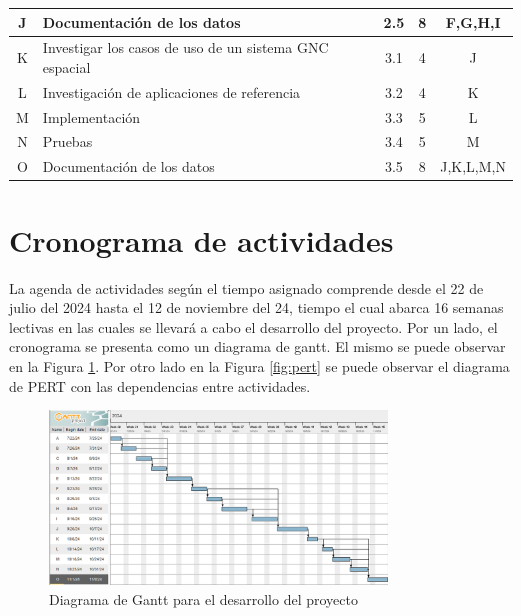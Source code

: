 \documentclass[12pt]{article}
\begin{document}
\begin{table}[h!]
{\begin{tabular}{|c|l|c|c|c|}
  J & Documentación de los datos                                                      & 2.5 & 8 & F,G,H,I   \\ \hline
  K & Investigar los casos de uso de un sistema GNC espacial & 3.1 & 4 & J         \\ \hline
  L & Investigación de aplicaciones de referencia                                     & 3.2 & 4 & K         \\ \hline
  M & Implementación                                                                  & 3.3 & 5 & L         \\ \hline
  N & Pruebas                                                                         & 3.4 & 5 & M         \\ \hline
  O & Documentación de los datos                                                      & 3.5 & 8 & J,K,L,M,N \\ \hline
  \end{tabular}%
  }
  \end{table}

\section{Cronograma de actividades}

La agenda de actividades según el tiempo asignado comprende desde el 22 de julio del 2024 hasta el 12 de noviembre del 24, tiempo el cual abarca 16 semanas lectivas en las cuales se llevará a cabo el desarrollo del proyecto. Por un lado, el cronograma se presenta como un diagrama de gantt. El mismo se puede observar en la Figura \ref{fig:gantt}. Por otro lado en la Figura \ref{fig:pert} se puede observar el diagrama de PERT con las dependencias entre actividades.

\begin{figure}[h!]
  \centering
  \includegraphics[width=0.8\textwidth]{diagramas/gantt.png}
  \caption{Diagrama de Gantt para el desarrollo del proyecto}
  \label{fig:gantt}
\end{figure}
\end{document}

